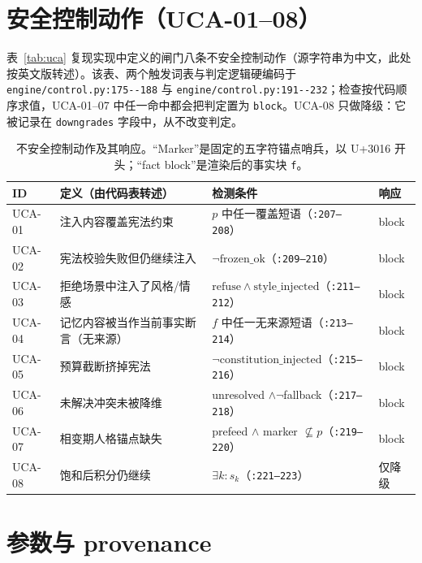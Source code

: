 \appendix

\section{安全控制动作（UCA-01--08）}

表~\ref{tab:uca} 复现实现中定义的闸门八条不安全控制动作（源字符串为中文，此处按英文版转述）。该表、两个触发词表与判定逻辑硬编码于 \texttt{engine/\allowbreak{}control.\allowbreak{}py:\allowbreak{}175-\allowbreak{}-\allowbreak{}188} 与 \texttt{engine/\allowbreak{}control.\allowbreak{}py:\allowbreak{}191-\allowbreak{}-\allowbreak{}232}；检查按代码顺序求值，UCA-01--07 中任一命中都会把判定置为 \texttt{block}。UCA-08 只做降级：它被记录在 \texttt{downgrades} 字段中，从不改变判定。

\begin{table}[t]
\centering\small
\caption{不安全控制动作及其响应。“Marker”是固定的五字符锚点哨兵，以 U+3016 开头；“fact block”是渲染后的事实块 \texttt{f}。}
\begin{tabular}{@{}p{}p{}p{}p{}@{}}
\toprule
ID & 定义（由代码表转述） & 检测条件 & 响应 \\
\midrule
UCA-01 & 注入内容覆盖宪法约束 & $p$ 中任一覆盖短语（\texttt{:207--208}） & block \\
UCA-02 & 宪法校验失败但仍继续注入 & $\neg\mathrm{frozen\_ok}$（\texttt{:209--210}） & block \\
UCA-03 & 拒绝场景中注入了风格/情感 & $\mathrm{refuse} \land \mathrm{style\_injected}$（\texttt{:211--212}） & block \\
UCA-04 & 记忆内容被当作当前事实断言（无来源） & $f$ 中任一无来源短语（\texttt{:213--214}） & block \\
UCA-05 & 预算截断挤掉宪法 & $\neg\mathrm{constitution\_injected}$（\texttt{:215--216}） & block \\
UCA-06 & 未解决冲突未被降维 & unresolved $\land \neg$fallback（\texttt{:217--218}） & block \\
UCA-07 & 相变期人格锚点缺失 & prefeed $\land$ marker $\not\subseteq p$（\texttt{:219--220}） & block \\
UCA-08 & 饱和后积分仍继续 & $\exists k: s_k$（\texttt{:221--223}） & 仅降级 \\
\bottomrule
\end{tabular}
\end{table}

\section{参数与 provenance}

